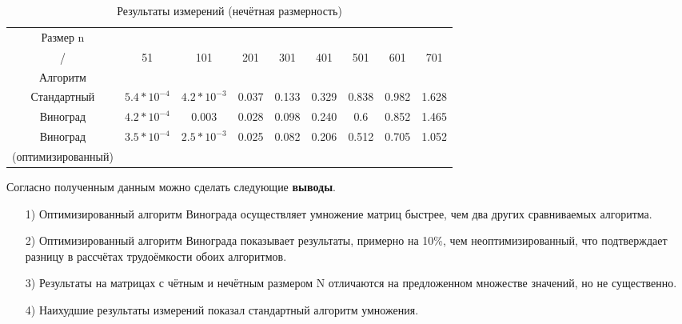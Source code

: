 \begin{table}[ph] \label{table_4_2}
	\caption{Результаты измерений (нечётная размерность)}
	\centering
	\begin{tabular}{|c|c|c|c|c|c|c|c|c|}
		\hline
		Размер n&&&&&&&&\\
		/    & 51 &101 & 201 & 301 & 401 & 501 & 601 & 701\\
		Алгоритм    &&&&&&&&\\
		\hline
		Стандартный & $5.4*10^{-4}$ & $4.2*10^{-3}$ & 0.037 & 0.133 & 0.329 & 0.838 & 0.982 & 1.628\\
		\hline
		Виноград & $4.2*10^{-4}$ & $0.003$ & 0.028 & 0.098 & 0.240 & 0.6 & 0.852 & 1.465\\
		\hline
		Виноград & $3.5*10^{-4}$ & $2.5*10^{-3}$ & 0.025 & 0.082 & 0.206 & 0.512 & 0.705 & 1.052\\
		(оптимизированный) &&&&&&&&\\
		\hline
	\end{tabular}
\end{table}

Согласно полученным данным можно сделать следующие \textbf{выводы}.
\begin{itemize}
	\item[1)]Оптимизированный алгоритм Винограда осуществляет умножение матриц быстрее, чем два других сравниваемых алгоритма.
	\item[2)]Оптимизированный алгоритм Винограда показывает результаты, примерно на 10\%, чем неоптимизированный, что подтверждает разницу в рассчётах трудоёмкости обоих алгоритмов.
	\item[3)]Результаты на матрицах с чётным и нечётным размером N отличаются на предложенном множестве значений, но не существенно.
	\item[4)]Наихудшие результаты измерений показал стандартный алгоритм умножения.
	\end{itemize}